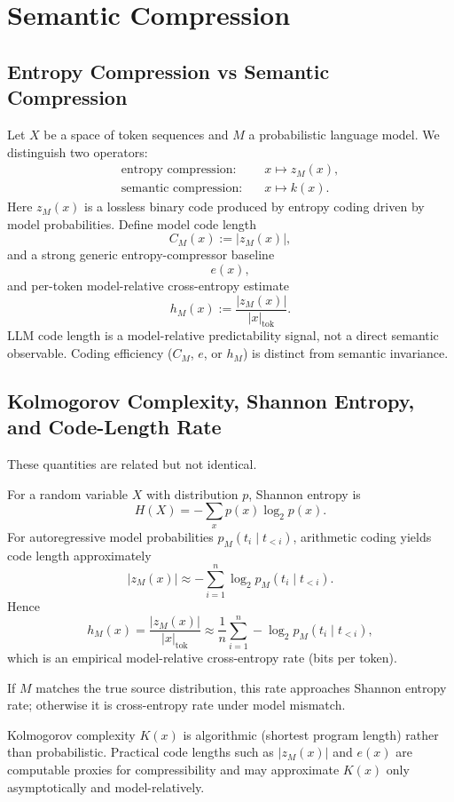
\section{Semantic Compression}

\subsection{Entropy Compression vs Semantic Compression}
Let $X$ be a space of token sequences and $M$ a probabilistic language model. We distinguish two operators:
\begin{align*}
\text{entropy compression:} \quad &x \mapsto z_M(x), \\
\text{semantic compression:} \quad &x \mapsto k(x).
\end{align*}
Here $z_M(x)$ is a lossless binary code produced by entropy coding driven by model probabilities. Define model code length
\[
C_M(x) := |z_M(x)|,
\]
and a strong generic entropy-compressor baseline
\[
e(x),
\]
and per-token model-relative cross-entropy estimate
\[
h_M(x) := \frac{|z_M(x)|}{|x|_{\mathrm{tok}}}.
\]
LLM code length is a model-relative predictability signal, not a direct semantic observable. Coding efficiency ($C_M$, $e$, or $h_M$) is distinct from semantic invariance.

\subsection{Kolmogorov Complexity, Shannon Entropy, and Code-Length Rate}
These quantities are related but not identical.

For a random variable $X$ with distribution $p$, Shannon entropy is
\[
H(X) = -\sum_x p(x)\log_2 p(x).
\]
For autoregressive model probabilities $p_M(t_i\mid t_{<i})$, arithmetic coding yields code length approximately
\[
|z_M(x)| \approx -\sum_{i=1}^{n} \log_2 p_M(t_i\mid t_{<i}).
\]
Hence
\[
h_M(x) = \frac{|z_M(x)|}{|x|_{\mathrm{tok}}}
\approx
\frac{1}{n}\sum_{i=1}^{n} -\log_2 p_M(t_i\mid t_{<i}),
\]
which is an empirical model-relative cross-entropy rate (bits per token).

If $M$ matches the true source distribution, this rate approaches Shannon entropy rate; otherwise it is cross-entropy rate under model mismatch.

Kolmogorov complexity $K(x)$ is algorithmic (shortest program length) rather than probabilistic. Practical code lengths such as $|z_M(x)|$ and $e(x)$ are computable proxies for compressibility and may approximate $K(x)$ only asymptotically and model-relatively.

